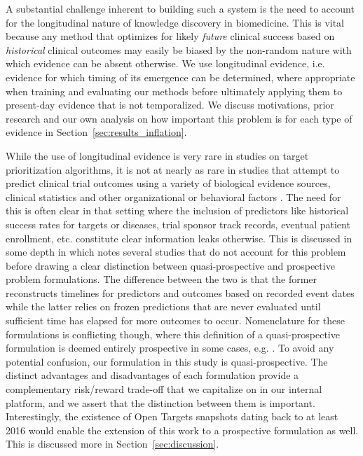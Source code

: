\documentclass{article}
\begin{document}
A substantial challenge inherent to building such a system is the need to account for the longitudinal nature of knowledge discovery in biomedicine. This is vital because any method that optimizes for likely \textit{future} clinical success based on \textit{historical} clinical outcomes may easily be biased by the non-random nature with which evidence can be absent otherwise. We use longitudinal evidence, i.e. evidence for which timing of its emergence can be determined, where appropriate when training and evaluating our methods before ultimately applying them to present-day evidence that is not temporalized. We discuss motivations, prior research and our own analysis on how important this problem is for each type of evidence in Section~\ref{sec:results_inflation}.

While the use of longitudinal evidence is very rare in studies on target prioritization algorithms, it is not at nearly as rare in studies that attempt to predict clinical trial outcomes using a variety of biological evidence sources, clinical statistics and other organizational or behavioral factors \cite{PMID:37483175, PMID:34430930, Lo2019Machine}. The need for this is often clear in that setting where the inclusion of predictors like historical success rates for targets or diseases, trial sponsor track records, eventual patient enrollment, etc. constitute clear information leaks otherwise. This is discussed in some depth in \cite{PMID:37483175} which notes several studies that do not account for this problem before drawing a clear distinction between quasi-prospective and prospective problem formulations. The difference between the two is that the former reconstructs timelines for predictors and outcomes based on recorded event dates while the latter relies on frozen predictions that are never evaluated until sufficient time has elapsed for more outcomes to occur. Nomenclature for these formulations is conflicting though, where this definition of a quasi-prospective formulation is deemed entirely prospective in some cases, e.g. \cite{PMID:37225853}. To avoid any potential confusion, our formulation in this study is quasi-prospective. The distinct advantages and disadvantages of each formulation provide a complementary risk/reward trade-off that we capitalize on in our internal platform, and we assert that the distinction between them is important. Interestingly, the existence of Open Targets snapshots dating back to at least 2016 would enable the extension of this work to a prospective formulation as well. This is discussed more in Section~\ref{sec:discussion}.
\end{document}
